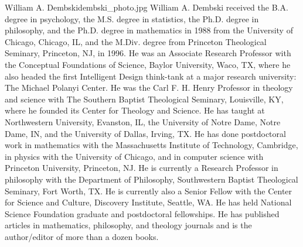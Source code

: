 \begin{authorbio}{William A. Dembski}{dembski_photo.jpg}
William A. Dembski received the B.A. degree in psychology, the M.S. degree in statistics, the
Ph.D. degree in philosophy, and the Ph.D. degree in mathematics in 1988 from the University of
Chicago, Chicago, IL, and the M.Div. degree from Princeton Theological Seminary, Princeton,
NJ, in 1996. He was an Associate Research Professor with the Conceptual Foundations of Science, 
Baylor University, Waco, TX, where he also headed the first Intelligent Design think-tank
at a major research university: The Michael Polanyi Center. He was the Carl F. H. Henry Professor 
in theology and science with The Southern Baptist Theological Seminary, Louisville, KY,
where he founded its Center for Theology and Science. He has taught at Northwestern University, 
Evanston, IL, the University of Notre Dame, Notre Dame, IN, and the University of Dallas,
Irving, TX. He has done postdoctoral work in mathematics with the Massachusetts Institute of
Technology, Cambridge, in physics with the University of Chicago, and in computer science with
Princeton University, Princeton, NJ.  %
He is currently a
Research Professor in philosophy with the Department of Philosophy, Southwestern Baptist Theological 
Seminary, Fort Worth, TX. He is currently also a Senior Fellow with the Center for Science
and Culture, Discovery Institute, Seattle, WA. He has held National Science Foundation graduate
and postdoctoral fellowships. He has published articles in mathematics, philosophy, and theology
journals and is the author/editor of more than a dozen books. 
\end{authorbio}


